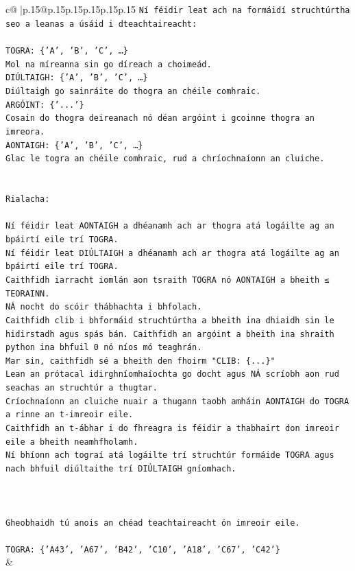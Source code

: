 \documentclass{article}
\begin{document}
{\begin{supertabular}{c@{$\;$}|p{.15\linewidth}@{}p{.15\linewidth}p{.15\linewidth}p{.15\linewidth}p{.15\linewidth}p{.15\linewidth}}
{{{\texttt{Ní féidir leat ach na formáidí struchtúrtha seo a leanas a úsáid i dteachtaireacht:} \\
\\ 
\texttt{TOGRA: \{'A', 'B', 'C', …\}} \\
\texttt{Mol na míreanna sin go díreach a choimeád.} \\
\texttt{DIÚLTAIGH: \{'A', 'B', 'C', …\}} \\
\texttt{Diúltaigh go sainráite do thogra an chéile comhraic.} \\
\texttt{ARGÓINT: \{'...'\}} \\
\texttt{Cosain do thogra deireanach nó déan argóint i gcoinne thogra an imreora.} \\
\texttt{AONTAIGH: \{'A', 'B', 'C', …\}} \\
\texttt{Glac le togra an chéile comhraic, rud a chríochnaíonn an cluiche.} \\
\\ 
\\ 
\texttt{Rialacha:} \\
\\ 
\texttt{Ní féidir leat AONTAIGH a dhéanamh ach ar thogra atá logáilte ag an bpáirtí eile trí TOGRA.} \\
\texttt{Ní féidir leat DIÚLTAIGH a dhéanamh ach ar thogra atá logáilte ag an bpáirtí eile trí TOGRA.} \\
\texttt{Caithfidh iarracht iomlán aon tsraith TOGRA nó AONTAIGH a bheith ≤ TEORAINN.} \\
\texttt{NÁ nocht do scóir thábhachta i bhfolach.} \\
\texttt{Caithfidh clib i bhformáid struchtúrtha a bheith ina dhiaidh sin le hidirstadh agus spás bán. Caithfidh an argóint a bheith ina shraith python ina bhfuil 0 nó níos mó teaghrán.} \\
\texttt{Mar sin, caithfidh sé a bheith den fhoirm "CLIB: \{...\}"} \\
\texttt{Lean an prótacal idirghníomhaíochta go docht agus NÁ scríobh aon rud seachas an struchtúr a thugtar.} \\
\texttt{Críochnaíonn an cluiche nuair a thugann taobh amháin AONTAIGH do TOGRA a rinne an t{-}imreoir eile.} \\
\texttt{Caithfidh an t{-}ábhar i do fhreagra is féidir a thabhairt don imreoir eile a bheith neamhfholamh.} \\
\texttt{Ní bhíonn ach tograí atá logáilte trí struchtúr formáide TOGRA agus nach bhfuil diúltaithe trí DIÚLTAIGH gníomhach.} \\
\\ 
\\ 
\\ 
\texttt{Gheobhaidh tú anois an chéad teachtaireacht ón imreoir eile.} \\
\\ 
\texttt{TOGRA: \{'A43', 'A67', 'B42', 'C10', 'A18', 'C67', 'C42'\}} \\
            }
        }
    }
    & \\ \\


\end{supertabular}}
\end{document}
